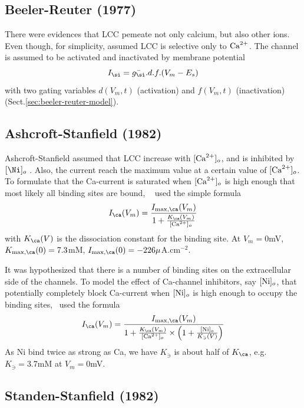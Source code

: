 \subsection{Beeler-Reuter (1977)}

There were evidences that LCC pemeate not only calcium, but also other ions.
Even though, for simplicity, \citep{beeler1977rap} assumed LCC is selective only
to ${\text{Ca}^{2+}}$. The channel is assumed to be activated and inactivated by membrane
potential
\begin{equation}
I_\si = \bar{g_\si}.d.f.(V_m-E_s)
\end{equation}
with two gating variables $d(V_m,t)$ (activation) and $f(V_m,t)$ (inactivation)
(Sect.\ref{sec:beeler-reuter-model}).

\subsection{Ashcroft-Stanfield (1982)}

Ashcroft-Stanfield assumed that LCC increase with $[{\text{Ca}^{2+}}]_o$, and is inhibited by
$[\Ni]_o$ \citep{ashcroft1982cis, ashcroft1982}. Also, the current reach the
maximum value at a certain value of $[{\text{Ca}^{2+}}]_o$. To formulate that the Ca-current
is saturated when $[{\text{Ca}^{2+}}]_o$ is high enough that most likely all binding sites
are bound, ~\citep{ashcroft1982} used the simple formula
\begin{equation}
  \label{eq:1074}
  I_\ca(V_m) = \frac{I_{\max,\ca}(V_m)}{1+\frac{K_\ca(V_m)}{[\Ca]_o}}
\end{equation}
with $K_\ca(V)$ is the dissociation constant for the binding site. At
$V_m=0$mV, $K_{\max,\ca}(0)=7.3$mM,
$I_{\max,\ca}(0)=-226\mu$A.cm$^{-2}$. 


It was hypothesized that there is a number of binding sites on the extracellular
side of the channels. To model the effect of Ca-channel inhibitors, say
$\ce{[Ni]_o}$, that potentially completely block Ca-current when $[\ce{Ni}]_o$
is high enough to occupy the binding sites,~\citep{ashcroft1982} used the
formula
\begin{equation}
  \label{eq:1075}
  I_\ca(V_m) =
  \frac{I_{\max,\ca}(V_m)}{1+\frac{K_\ca(V_m)}{[\Ca]_o}\times \left(1+\frac{[\ce{Ni}]_o}{K_\ni(V)} \right)}
\end{equation}
As Ni bind twice as strong as Ca, we have $K_\ni$ is about half of
$K_\ca$, e.g. $K_\ni=3.7$mM at $V_m=0$mV. 

\subsection{Standen-Stanfield (1982)}

